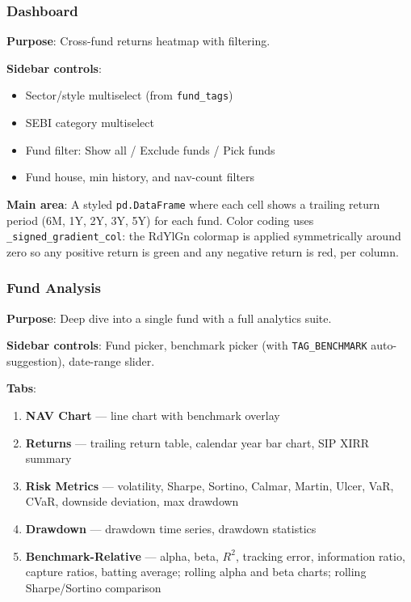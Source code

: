 \documentclass[12pt, a4paper]{article}
\begin{document}
\subsubsection{Dashboard}

\textbf{Purpose}: Cross-fund returns heatmap with filtering.

\noindent\textbf{Sidebar controls}:
\begin{itemize}[noitemsep]
  \item Sector/style multiselect (from \texttt{fund\_tags})
  \item SEBI category multiselect
  \item Fund filter: Show all / Exclude funds / Pick funds
  \item Fund house, min history, and nav-count filters
\end{itemize}

\noindent\textbf{Main area}: A styled \texttt{pd.DataFrame} where each cell
shows a trailing return period (6M, 1Y, 2Y, 3Y, 5Y) for each fund.  Color
coding uses \texttt{\_signed\_gradient\_col}: the RdYlGn colormap is applied
symmetrically around zero so any positive return is green and any negative
return is red, per column.

\subsubsection{Fund Analysis}

\textbf{Purpose}: Deep dive into a single fund with a full analytics suite.

\noindent\textbf{Sidebar controls}: Fund picker, benchmark picker (with
\texttt{TAG\_BENCHMARK} auto-suggestion), date-range slider.

\noindent\textbf{Tabs}:
\begin{enumerate}[noitemsep]
  \item \textbf{NAV Chart} — line chart with benchmark overlay
  \item \textbf{Returns} — trailing return table, calendar year bar chart,
    SIP XIRR summary
  \item \textbf{Risk Metrics} — volatility, Sharpe, Sortino, Calmar, Martin,
    Ulcer, VaR, CVaR, downside deviation, max drawdown
  \item \textbf{Drawdown} — drawdown time series, drawdown statistics
  \item \textbf{Benchmark-Relative} — alpha, beta, $R^2$, tracking error,
    information ratio, capture ratios, batting average; rolling alpha and beta
    charts; rolling Sharpe/Sortino comparison
\end{enumerate}
\end{document}
